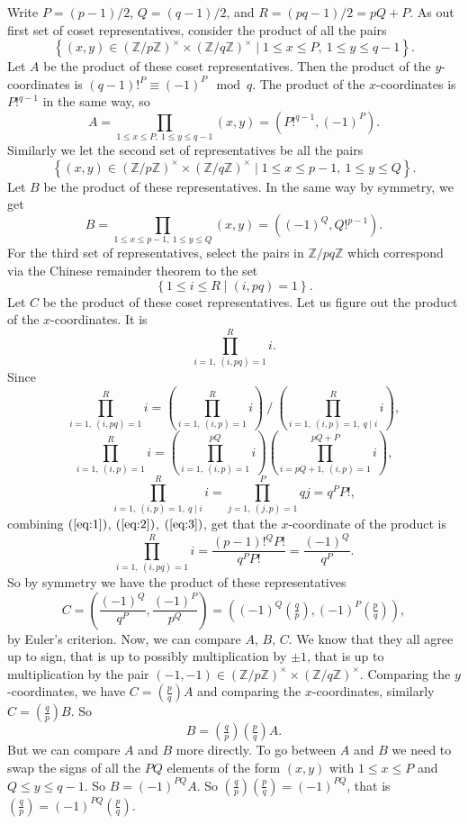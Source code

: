 \documentclass{article}
\newcommand{\Z}{\mathbb{Z}}
\newcommand{\rb}[1]{\left( #1 \right)}
\newcommand{\cb}[1]{\left\{ #1 \right\}}
\newcommand{\unit}[1]{\rb{\Z / #1\Z}^\times}
\newcommand{\legendre}[2]{\rb{\tfrac{#1}{#2}}}
\theoremstyle{definition}\newtheorem{definition}{Definition}
\theoremstyle{definition}\newtheorem*{remark}{Remark}
\theoremstyle{definition}\newtheorem*{example}{Example}
\theoremstyle{definition}\newtheorem*{note}{Note}
\begin{document}
Write $ P = \rb{p - 1} / 2 $, $ Q = \rb{q - 1} / 2 $, and $ R = \rb{pq - 1} / 2 = pQ + P $. As out first set of coset representatives, consider the product of all the pairs
$$ \cb{\rb{x, y} \in \unit{p} \times \unit{q} \mid 1 \le x \le P, \ 1 \le y \le q - 1}. $$ Let $ A $ be the product of these coset representatives. Then the product of the $ y $-coordinates is $ \rb{q - 1}!^P \equiv \rb{-1}^P \mod q $. The product of the $ x $-coordinates is $ P!^{q - 1} $ in the same way, so
$$ A = \prod_{1 \le x \le P, \ 1 \le y \le q - 1} \rb{x, y} = \rb{P!^{q - 1}, \rb{-1}^P}. $$
Similarly we let the second set of representatives be all the pairs
$$ \cb{\rb{x, y} \in \unit{p} \times \unit{q} \mid 1 \le x \le p - 1, \ 1 \le y \le Q}. $$
Let $ B $ be the product of these representatives. In the same way by symmetry, we get
$$ B = \prod_{1 \le x \le p - 1, \ 1 \le y \le Q} \rb{x, y} = \rb{\rb{-1}^Q, Q!^{p - 1}}. $$
For the third set of representatives, select the pairs in $ \Z / pq\Z $ which correspond via the Chinese remainder theorem to the set
$$ \cb{1 \le i \le R \mid \rb{i, pq} = 1}. $$
Let $ C $ be the product of these coset representatives. Let us figure out the product of the $ x $-coordinates. It is
$$ \prod_{i = 1, \ \rb{i, pq} = 1}^R i. $$
Since
\begin{equation}
\label{eq:1}
\prod_{i = 1, \ \rb{i, pq} = 1}^R i = \rb{\prod_{i = 1, \ \rb{i, p} = 1}^R i} \ \Bigg/ \ \rb{\prod_{i = 1, \ \rb{i, p} = 1, \ q \mid i}^R i},
\end{equation}
\begin{equation}
\label{eq:2}
\prod_{i = 1, \ \rb{i, p} = 1}^R i = \rb{\prod_{i = 1, \ \rb{i, p} = 1}^{pQ} i}\rb{\prod_{i = pQ + 1, \ \rb{i, p} = 1}^{pQ + P} i},
\end{equation}
\begin{equation}
\label{eq:3}
\prod_{i = 1, \ \rb{i, p} = 1, \ q \mid i}^{R} i = \prod_{j = 1, \ \rb{j, p} = 1}^{P} qj = q^PP!,
\end{equation}
combining $ \rb{\ref{eq:1}} $, $ \rb{\ref{eq:2}} $, $ \rb{\ref{eq:3}} $, get that the $ x $-coordinate of the product is
$$ \prod_{i = 1, \ \rb{i, pq} = 1}^R i = \dfrac{\rb{p - 1}!^QP!}{q^PP!} = \dfrac{\rb{-1}^Q}{q^P}. $$
So by symmetry we have the product of these representatives
$$ C = \rb{\dfrac{\rb{-1}^Q}{q^P}, \dfrac{\rb{-1}^P}{p^Q}} = \rb{\rb{-1}^Q\legendre{q}{p}, \rb{-1}^P\legendre{p}{q}}, $$
by Euler's criterion. Now, we can compare $ A $, $ B $, $ C $. We know that they all agree up to sign, that is up to possibly multiplication by $ \pm 1 $, that is up to multiplication by the pair $ \rb{-1, -1} \in \unit{p} \times \unit{q} $. Comparing the $ y $-coordinates, we have $ C = \legendre{p}{q}A $ and comparing the $ x $-coordinates, similarly $ C = \legendre{q}{p}B $. So
$$ B = \legendre{q}{p}\legendre{p}{q}A. $$
But we can compare $ A $ and $ B $ more directly. To go between $ A $ and $ B $ we need to swap the signs of all the $ PQ $ elements of the form $ \rb{x, y} $ with $ 1 \le x \le P $ and $ Q \le y \le q - 1 $. So $ B = \rb{-1}^{PQ}A $. So $ \legendre{q}{p}\legendre{p}{q} = \rb{-1}^{PQ} $, that is $ \legendre{q}{p} = \rb{-1}^{PQ}\legendre{p}{q} $.
\end{document}
